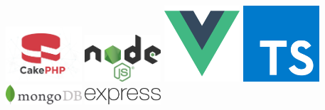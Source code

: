 \documentclass{material-resume}
\begin{document}
\begin{minipage}[t]{0.35\textwidth}
\begin{tcolorbox}[
            boxrule=0pt,
            top=0pt,
            colback=white,
            enhanced,
            drop shadow,
    	]
    	\includegraphics[width=80pt]{img/cake-php-img.png}
    	\hspace*{.7cm}
    	\includegraphics[width=80pt]{img/node.png}
    	\includegraphics[width=80pt]{img/vue.png}
    	\hspace*{.7cm}
    	\includegraphics[width=80pt]{img/ts.png}
    	\includegraphics[width=80pt]{img/mongo.jpg}
    	\hspace*{.7cm}
    	\includegraphics[width=80pt]{img/expressjs-logo.png}
    	\sectionsep
    \end{tcolorbox} 	
    \end{minipage}
\hfill
\vspace{7pt}
\end{document}
